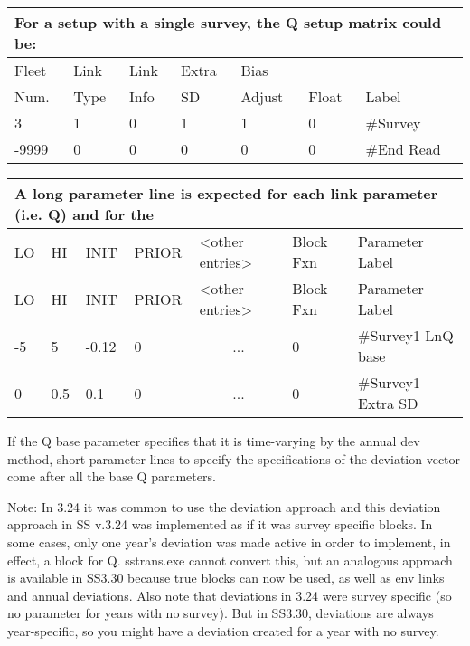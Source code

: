 \begin{longtable}{p{2cm} p{2cm} p{2cm} p{2cm} p{2cm} p{1.3cm} p{2.3cm}}
	\multicolumn{7}{l}{For a setup with a single survey, the Q setup matrix could be:}\\
	\hline
	Fleet \Tstrut & Link & Link & Extra  & Bias   &   & \\
	Num.          & Type & Info & SD     & Adjust & Float  & Label\Bstrut\\
	\hline
	3 & 1 & 0 & 1 & 1 & 0 & \#Survey  \Tstrut\\
	-9999 & 0 & 0 & 0 & 0 & 0 & \#End Read \Bstrut\\
	\hline
\end{longtable}


\begin{longtable}{p{1cm} p{1cm} p{1cm}  p{1.5cm}  p{3cm}  p{2cm}  p{4cm} }
	\multicolumn{7}{l}{A long parameter line is expected for each link parameter (i.e. Q) and for the}\\
	\hline
	LO \Tstrut & HI & INIT & PRIOR &  <other entries> & Block Fxn & Parameter Label\Bstrut\\
	\hline
	\endfirsthead

	\hline
	LO \Tstrut & HI & INIT & PRIOR & <other entries> & Block Fxn & Parameter Label\Bstrut\\
	\hline
	\endhead

	\hline
	\endfoot
	\endlastfoot

	-5 & 5   & -0.12 & 0 & \multicolumn{1}{c}{...} & 0  & \#Survey1 LnQ base\Tstrut\\
	0  & 0.5 & 0.1   & 0 & \multicolumn{1}{c}{...} & 0  & \#Survey1 Extra SD\Bstrut\\
	\hline
\end{longtable}

If the Q base parameter specifies that it is time-varying by the annual dev method, short parameter lines to specify the specifications of the deviation vector come after all the base Q parameters.

Note: In 3.24 it was common to use the deviation approach and this deviation approach in SS v.3.24 was implemented as if it was survey specific blocks.  In some cases, only one year's deviation was made active in order to implement, in effect, a block for Q.  sstrans.exe cannot convert this, but an analogous approach is available in SS3.30 because true blocks can now be used, as well as env links and annual deviations.  Also note that deviations in 3.24 were survey specific (so no parameter for years with no survey).  But in SS3.30, deviations are always year-specific, so you might have a deviation created for a year with no survey.

